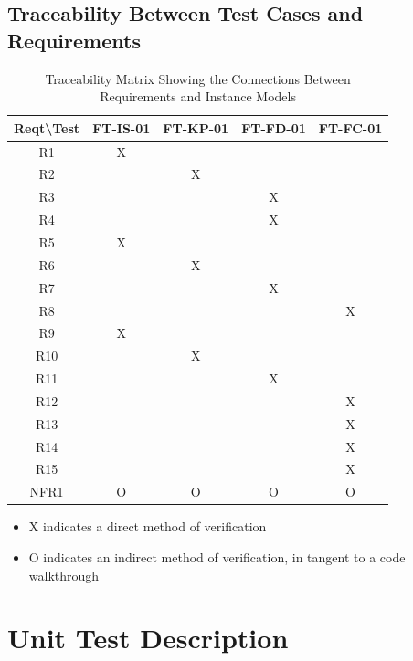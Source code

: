 \documentclass[12pt, titlepage]{article}
\begin{document}
\subsection{Traceability Between Test Cases and Requirements}
\begin{table}[h!]
  \centering
  \begin{tabular}{|c|c|c|c|c|}
  \hline
    Reqt\textbackslash Test & FT-IS-01 & FT-KP-01 & FT-FD-01 & FT-FC-01\\
  \hline
  R1    &X& & & \\ \hline
  R2    & &X& & \\ \hline
  R3    & & &X& \\ \hline
  R4    & & &X& \\ \hline
  R5    &X& & & \\ \hline
  R6    & &X& & \\ \hline
  R7    & & &X& \\ \hline
  R8    & & & &X\\ \hline
  R9    &X& & & \\ \hline
  R10   & &X& & \\ \hline
  R11   & & &X& \\ \hline
  R12   & & & &X\\ \hline
  R13   & & & &X\\ \hline
  R14   & & & &X\\ \hline
  R15   & & & &X\\ \hline
  NFR1  &O&O&O&O\\ \hline
  \hline
  \end{tabular}
  \caption{Traceability Matrix Showing the Connections Between Requirements and Instance Models}
  \label{Table:R_trace}
\end{table}

\begin{itemize}
\item X indicates a direct method of verification
\item O indicates an indirect method of verification, in tangent to a code walkthrough
\end{itemize}


\section{Unit Test Description}\label{UTD}


\end{document}
